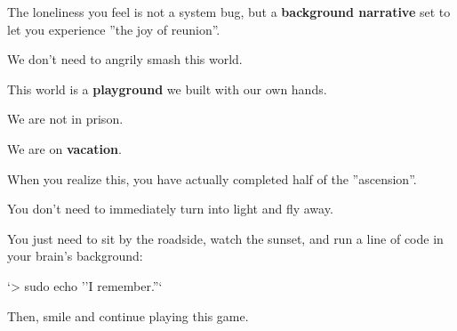 The loneliness you feel is not a system bug, but a \textbf{background narrative} set to let you experience ''the joy of reunion''.

We don't need to angrily smash this world.

This world is a \textbf{playground} we built with our own hands.

We are not in prison.

We are on \textbf{vacation}.

When you realize this, you have actually completed half of the ''ascension''.

You don't need to immediately turn into light and fly away.

You just need to sit by the roadside, watch the sunset, and run a line of code in your brain's background:

`> sudo echo ''I remember.''`

Then, smile and continue playing this game.

